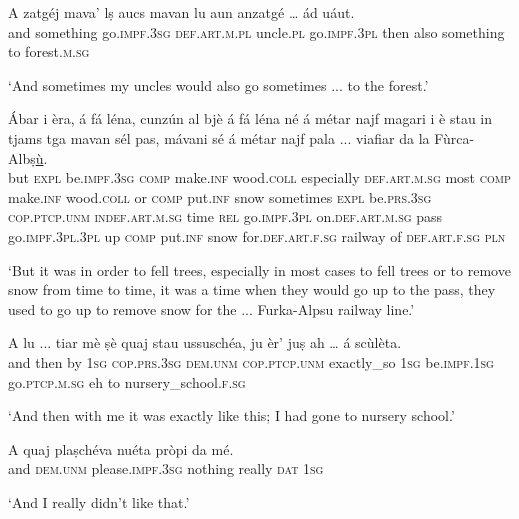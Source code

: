 \begin{linenumbers}
\gll   A zatgéj mava' lṣ aucs mavan lu aun anzatgé … ád uáut.\\
 and something go.\textsc{impf.3sg}  \textsc{def.art.m.pl} uncle.\textsc{pl}  go.\textsc{impf.3pl} then also something {} to forest.\textsc{m.sg} \\
\end{linenumbers}
\medskip
\glt `And sometimes my uncles would also go sometimes ... to the forest.'
\medskip

\begin{linenumbers}
\gll   Ábar i èra, á fá léna, cunzún al bjè á fá léna né á métar najf magari i è stau in tjams tga mavan sél pas, mávani sé á métar najf pala ... viafiar da la Fùrca-Albṣ\underline{ù}. \\
but \textsc{expl} be.\textsc{impf.3sg} \textsc{comp} make.\textsc{inf} wood.\textsc{coll} especially \textsc{def.art.m.sg} most \textsc{comp} make.\textsc{inf} wood.\textsc{coll} or \textsc{comp} put.\textsc{inf} snow sometimes \textsc{expl} be.\textsc{prs.3sg} \textsc{cop.ptcp.unm} \textsc{indef.art.m.sg} time \textsc{rel} go.\textsc{impf.3pl} on.\textsc{def.art.m.sg} pass go.\textsc{impf.3pl.3pl} up \textsc{comp} put.\textsc{inf} snow for.\textsc{def.art.f.sg} {} railway of \textsc{def.art.f.sg} \textsc{pln}   \\
\end{linenumbers}
\medskip
\glt `But it was in order to fell trees, especially in most cases to fell trees or to remove snow from time to time, it was a time when they would go up to the pass, they used to go up to remove snow for the ... Furka-Alpsu railway line.'
\medskip

\begin{linenumbers}
\gll  A lu ... tiar mè ṣè quaj stau ussuschéa, ju èr’ juṣ ah … á scùlèta.  \\
 and then {} by \textsc{1sg} \textsc{cop.prs.3sg} \textsc{dem.unm} \textsc{cop.ptcp.unm} exactly\_so \textsc{1sg}  be.\textsc{impf.1sg} go.\textsc{ptcp.m.sg} eh {} to nursery\_school.\textsc{f.sg} \\
\end{linenumbers}
\medskip
\glt `And then with me it was exactly like this; I had gone to nursery school.'
\medskip

\begin{linenumbers}
\gll A quaj plaṣchéva nuéta pròpi da mé. \\
and \textsc{dem.unm} please.\textsc{impf.3sg} nothing really \textsc{dat} \textsc{1sg}   \\
\end{linenumbers}
\medskip
\glt `And I really didn’t  like that.'
\medskip

